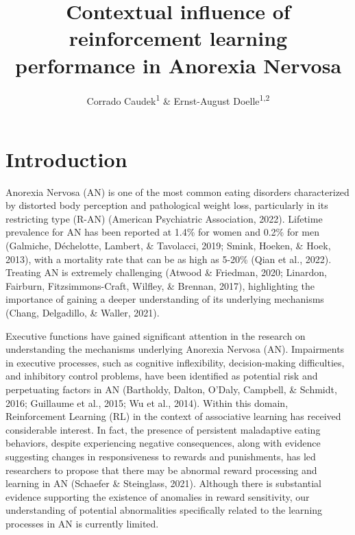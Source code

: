 \documentclass[
  man,floatsintext]{apa6}
\title{Contextual influence of reinforcement learning performance in Anorexia Nervosa}
\author{Corrado Caudek\textsuperscript{1} \& Ernst-August Doelle\textsuperscript{1,2}}
\date{}
\affiliation{\vspace{0.5cm}\textsuperscript{1} Wilhelm-Wundt-University\\\textsuperscript{2} Konstanz Business School}
\begin{document}
\maketitle

\hypertarget{introduction}{%
\section{Introduction}\label{introduction}}

Anorexia Nervosa (AN) is one of the most common eating disorders characterized by distorted body perception and pathological weight loss, particularly in its restricting type (R-AN) (American Psychiatric Association, 2022). Lifetime prevalence for AN has been reported at 1.4\% for women and 0.2\% for men (Galmiche, Déchelotte, Lambert, \& Tavolacci, 2019; Smink, Hoeken, \& Hoek, 2013), with a mortality rate that can be as high as 5-20\% (Qian et al., 2022). Treating AN is extremely challenging (Atwood \& Friedman, 2020; Linardon, Fairburn, Fitzsimmons-Craft, Wilfley, \& Brennan, 2017), highlighting the importance of gaining a deeper understanding of its underlying mechanisms (Chang, Delgadillo, \& Waller, 2021).

Executive functions have gained significant attention in the research on understanding the mechanisms underlying Anorexia Nervosa (AN). Impairments in executive processes, such as cognitive inflexibility, decision-making difficulties, and inhibitory control problems, have been identified as potential risk and perpetuating factors in AN (Bartholdy, Dalton, O'Daly, Campbell, \& Schmidt, 2016; Guillaume et al., 2015; Wu et al., 2014). Within this domain, Reinforcement Learning (RL) in the context of associative learning has received considerable interest. In fact, the presence of persistent maladaptive eating behaviors, despite experiencing negative consequences, along with evidence suggesting changes in responsiveness to rewards and punishments, has led researchers to propose that there may be abnormal reward processing and learning in AN (Schaefer \& Steinglass, 2021). Although there is substantial evidence supporting the existence of anomalies in reward sensitivity, our understanding of potential abnormalities specifically related to the learning processes in AN is currently limited.
\end{document}
